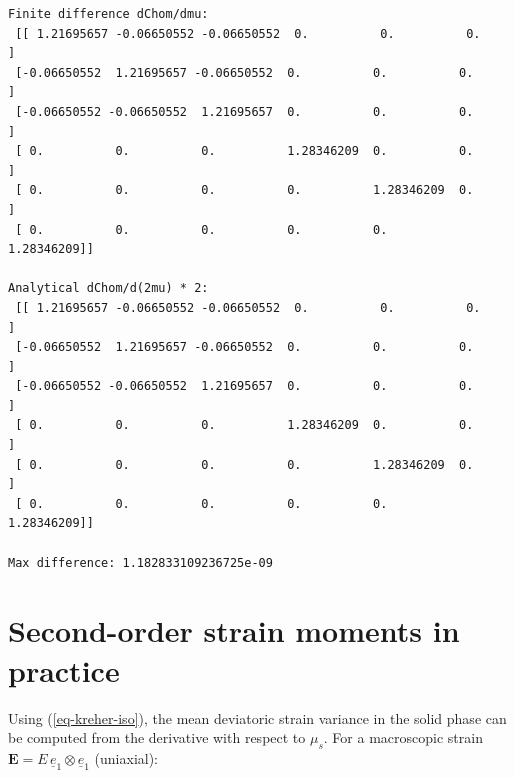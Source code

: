\documentclass[
  a4paper,
  numbers=noendperiod,
  DIV=12]{scrreprt}
\newcommand{\uu}[1]{{\symbf{{#1}}}}
\newcommand{\uv}[1]{{\underline{{#1}}}}
\begin{document}
\begin{verbatim}
Finite difference dChom/dmu:
 [[ 1.21695657 -0.06650552 -0.06650552  0.          0.          0.        ]
 [-0.06650552  1.21695657 -0.06650552  0.          0.          0.        ]
 [-0.06650552 -0.06650552  1.21695657  0.          0.          0.        ]
 [ 0.          0.          0.          1.28346209  0.          0.        ]
 [ 0.          0.          0.          0.          1.28346209  0.        ]
 [ 0.          0.          0.          0.          0.          1.28346209]]

Analytical dChom/d(2mu) * 2:
 [[ 1.21695657 -0.06650552 -0.06650552  0.          0.          0.        ]
 [-0.06650552  1.21695657 -0.06650552  0.          0.          0.        ]
 [-0.06650552 -0.06650552  1.21695657  0.          0.          0.        ]
 [ 0.          0.          0.          1.28346209  0.          0.        ]
 [ 0.          0.          0.          0.          1.28346209  0.        ]
 [ 0.          0.          0.          0.          0.          1.28346209]]

Max difference: 1.182833109236725e-09
\end{verbatim}

\section{Second-order strain moments in
practice}\label{second-order-strain-moments-in-practice}

Using (\ref{eq-kreher-iso}), the mean deviatoric strain variance in the
solid phase can be computed from the derivative with respect to
\(\mu_s\). For a macroscopic strain
\(\uu{E} = E\,\uv{e}_1 \otimes \uv{e}_1\) (uniaxial):
\end{document}
